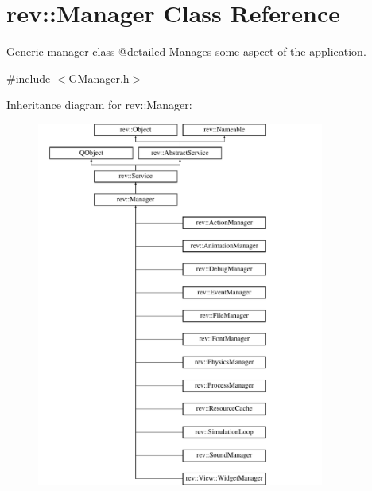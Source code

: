 \hypertarget{classrev_1_1_manager}{}\section{rev\+::Manager Class Reference}
\label{classrev_1_1_manager}


Generic manager class @detailed Manages some aspect of the application.  




{\ttfamily \#include $<$G\+Manager.\+h$>$}

Inheritance diagram for rev\+::Manager\+:\begin{figure}[H]
\begin{center}
\leavevmode
\includegraphics[height=12.000000cm]{classrev_1_1_manager}
\end{center}
\end{figure}
